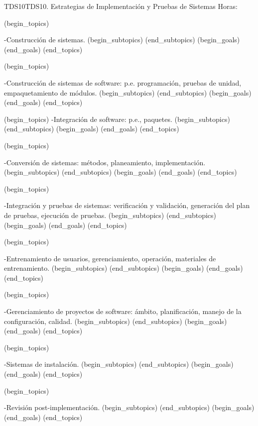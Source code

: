 \begin{BKL2}{TDS10}{TDS10. Estrategias de Implementación y Pruebas de Sistemas}
Horas:
 
(begin_topics)

-Construcción de sistemas.
(begin_subtopics)
(end_subtopics)
(begin_goals)
(end_goals)
(end_topics)

 

(begin_topics)

-Construcción de sistemas de software: p.e. programación, pruebas de unidad, empaquetamiento de módulos.
(begin_subtopics)
(end_subtopics)
(begin_goals)
(end_goals)
(end_topics)

 

(begin_topics)
-Integración de software: p.e., paquetes.
(begin_subtopics)
(end_subtopics)
(begin_goals)
(end_goals)
(end_topics)

 

(begin_topics)

-Conversión de sistemas: métodos, planeamiento, implementación.
(begin_subtopics)
(end_subtopics)
(begin_goals)
(end_goals)
(end_topics)

 

(begin_topics)

-Integración y pruebas de sistemas: verificación y validación, generación del plan de pruebas, ejecución de pruebas.
(begin_subtopics)
(end_subtopics)
(begin_goals)
(end_goals)
(end_topics)

 

(begin_topics)

-Entrenamiento de usuarios, gerenciamiento, operación, materiales de entrenamiento.
(begin_subtopics)
(end_subtopics)
(begin_goals)
(end_goals)
(end_topics)

 

(begin_topics)

-Gerenciamiento de proyectos de software: ámbito, planificación, manejo de la configuración, calidad.
(begin_subtopics)
(end_subtopics)
(begin_goals)
(end_goals)
(end_topics)

 

(begin_topics)

-Sistemas de instalación.
(begin_subtopics)
(end_subtopics)
(begin_goals)
(end_goals)
(end_topics)

 

(begin_topics)

-Revisión post-implementación.
(begin_subtopics)
(end_subtopics)
(begin_goals)
(end_goals)
(end_topics)

\end{BKL2}



